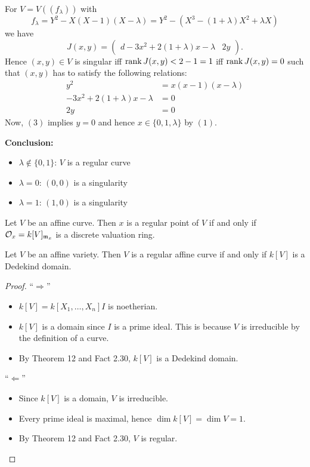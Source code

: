 \begin{Bsp}
For $V=V((f_\lambda))$ with 
\[f_\lambda = Y^2-X(X-1)(X-\lambda)
=Y^2-(X^3-(1+\lambda)X^2+\lambda X)
\]
we have
\[ J(x,y) = \begin{pmatrix}
d-3x^2 + 2(1+\lambda)x - \lambda & 2y
\end{pmatrix}.
\]
Hence $(x,y)\in V$ is singular iff $\operatorname{rank} J(x,y) < 2-1 = 1$ iff $\operatorname{rank} J(x,y) =0$ such that
$(x,y)$ has to satisfy the following relations:
\begin{align}
\tag{1} y^2 &= x(x-1)(x-\lambda) \\
\tag{2} -3x^2+2(1+\lambda)x-\lambda &= 0 \\
\tag{3} 2y &= 0
\end{align}
Now, $(3)$ implies $y=0$ and hence $x \in \{0,1,\lambda \}$ by $(1)$.

\bigskip
\textbf{Conclusion:}
\begin{itemize}
\item $\lambda \not \in \{0,1\}$: $V$ is a regular curve
\item $\lambda = 0$: $(0,0)$ is a singularity
\item $\lambda = 1$: $(1,0)$ is a singularity
\end{itemize}
\end{Bsp}


\begin{Fakt}
Let $V$ be an affine curve. Then $x$ is a regular point of $V$ if and only if 
$\mathcal{O}_x =k[V]_{\mathfrak{m}_x}$ is a discrete valuation ring.
\end{Fakt}

\begin{Bem}
Let $V$ be an affine variety. Then $V$ is a regular affine curve if and only if $k[V]$ is a Dedekind domain.
\end{Bem}

\begin{proof}
\enquote{$\Rightarrow$}
\begin{itemize}
\item $k[V] = k[X_1,\dots,X_n]  I$ is noetherian.
\item $k[V]$ is a domain since $I$ is a prime ideal. This is because $V$ is irreducible by the  definition of a curve.
\item By Theorem 12 and Fact 2.30, $k[V]$ is a Dedekind domain.
\end{itemize}
\enquote{$\Leftarrow$}
\begin{itemize}
	\item Since $k[V]$ is a domain, $V$ is irreducible.
	\item Every prime ideal is maximal, hence $\dim k[V] = \dim V =1$.
	\item By Theorem 12 and Fact 2.30, $V$ is regular.
\end{itemize}
\end{proof}



